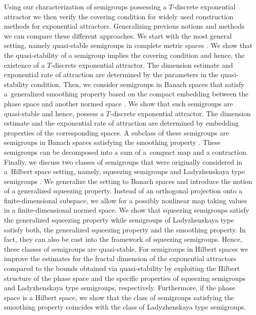 \documentclass[a4paper,12pt,reqno]{amsart}
\theoremstyle{plain}
\theoremstyle{definition}
\numberwithin{equation}{section}
\begin{document}
Using our characterization of semigroups possessing a $T$-discrete exponential attractor we then verify the covering condition for widely used construction methods for exponential attractors. Generalizing previous notions and methods we can compare these different approaches. We start with the most general setting, namely quasi-stable semigroups in complete metric spaces \cite{cl2008}. We show that the quasi-stability of a semigroup implies the covering condition and hence, the existence of a $T$-discrete exponential attractor. The dimension estimate and exponential rate of attraction are determined by the parameters in the quasi-stability condition. Then, we consider semigroups in Banach spaces that satisfy a~generalized smoothing property based on the compact embedding between the phase space and another normed space \cite{CzEf}. We show that such semigroups are quasi-stable and hence, possess a $T$-discrete exponential attractor. The dimension estimate and the exponential rate of attraction are determined by embedding properties of the corresponding spaces. A subclass of these semigroups are semigroups in Banach spaces satisfying the smoothing property \cite{EfMiZe}. These semigroups can be decomposed into a sum of a~compact map and a contraction. Finally, we discuss two classes of semigroups that were originally considered in a~Hilbert space setting, namely, squeezing semigroups \cite{EFNT94} and Ladyzhenskaya type semigroups \cite{Lad82b}. We generalize the setting to Banach spaces and introduce the notion of a generalized squeezing property. Instead of an orthogonal projection onto a finite-dimensional subspace, we allow for
a possibly nonlinear map taking values in a finite-dimensional normed space.
We show that squeezing semigroups satisfy the generalized squeezing property while semigroups of Ladyzhenskaya type satisfy both, the generalized squeezing property and the smoothing property. In fact, they can also be cast into the framework of squeezing semigroups. Hence, these classes of semigroups are quasi-stable. For semigroups in Hilbert spaces we improve the estimates for the fractal dimension of the exponential attractors 
compared to the bounds obtained via quasi-stability by exploiting the Hilbert structure of the phase space and the specific properties of squeezing semigroups and Ladyzhenskaya type semigroups, respectively. Furthermore, if the phase space is a Hilbert space, we show that the class of semigroups satisfying the smoothing property coincides with the class of Ladyzhenskaya type semigroups.
\end{document}
